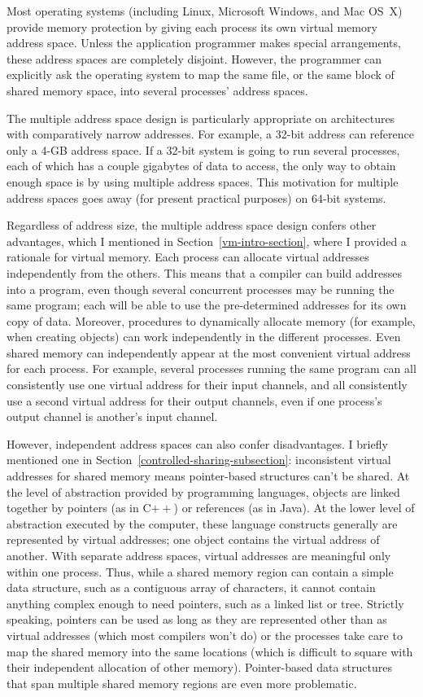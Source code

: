 Most operating systems (including Linux,
Microsoft Windows, and Mac OS~X) provide memory protection by giving each
process its own virtual memory address space.  Unless the application programmer
makes special arrangements, these address spaces are completely
disjoint.  However, the programmer can explicitly ask the operating
system to map the same file, or the same block of shared memory space,
into several processes' address spaces.

The multiple address space design is particularly appropriate on
architectures with comparatively narrow addresses.  For example, a
32-bit address can reference only a 4-GB address space.  If a 32-bit
system is going to run several processes, each of which has a couple
gigabytes of data to access, the only way to obtain enough space is by
using multiple address spaces.  This motivation for multiple address
spaces goes away (for present practical purposes) on 64-bit systems.

Regardless of address size, the multiple address space design confers
other advantages, which I mentioned in
Section~\ref{vm-intro-section}, where I provided a rationale for virtual memory.
Each process can allocate virtual addresses independently from the
others.  This means that a compiler can build addresses into a
program, even though several concurrent processes may be running the
same program; each will be able to use the pre-determined addresses
for its own copy of data.  Moreover, procedures to dynamically
allocate memory (for example, when creating objects) can work
independently in the different processes.  Even shared memory can
independently appear at the most convenient virtual address for each
process.  For example, several processes running the same program can
all consistently use one virtual address for their input channels, and
all consistently use a second virtual address for their output
channels, even if one process's output channel is another's input
channel.

However, independent address spaces can also confer disadvantages.  I
briefly mentioned one in Section~\ref{controlled-sharing-subsection}:
inconsistent virtual addresses for shared memory means pointer-based
structures can't be shared.  At the level of abstraction provided by
programming languages, objects are linked together by pointers (as
in C$++$) or references (as in Java).  At the lower level of
abstraction executed by the computer, these language constructs
generally are represented by virtual addresses; one object contains
the virtual address of another.  With separate address spaces, virtual
addresses are meaningful only within one process.  Thus, while a
shared memory region can contain a simple data structure, such as a
contiguous array of characters, it cannot contain anything complex
enough to need pointers, such as a linked list or tree.  Strictly
speaking, pointers can be used as long as they are represented other
than as virtual addresses (which most compilers won't do) or the
processes take care to map the shared memory into the same locations
(which is difficult to square with their independent allocation of
other memory).  Pointer-based data structures that span multiple
shared memory regions are even more problematic.

